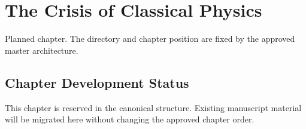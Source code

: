 \chapter{The Crisis of Classical Physics}
\label{chap:13-the-crisis-of-classical-physics}

\begin{roadmapbox}
Planned chapter. The directory and chapter position are fixed by the approved master architecture.
\end{roadmapbox}

\section*{Chapter Development Status}
This chapter is reserved in the canonical structure. Existing manuscript material will be migrated here without changing the approved chapter order.
